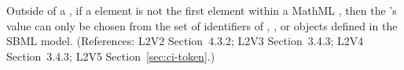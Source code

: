 Outside of a \FunctionDefinition, if a  element is not
the first element within a MathML , then the
's value can only be chosen from the set of identifiers
of \Species, \Compartment, \Parameter or \Reaction objects defined
in the SBML model.  (References: L2V2 Section~4.3.2; L2V3
Section~3.4.3; L2V4 Section~3.4.3; L2V5 Section~\ref{sec:ci-token}.)
